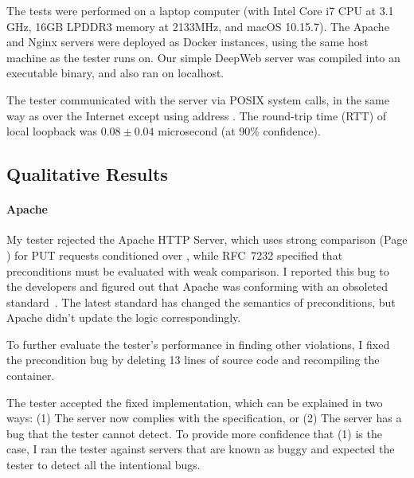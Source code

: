 The tests were performed on a laptop computer (with Intel Core i7 CPU at 3.1
GHz, 16GB LPDDR3 memory at 2133MHz, and macOS 10.15.7).  The Apache and Nginx
servers were deployed as Docker instances, using the same host machine as the
tester runs on.  Our simple DeepWeb server was compiled into an executable
binary, and also ran on localhost.

The tester communicated with the server via POSIX system calls, in the same way
as over the Internet except using address .  The round-trip
time (RTT) of local loopback was $0.08\pm0.04$ microsecond (at 90\% confidence).

\subsection{Qualitative Results}
\label{sec:http-qual}
\paragraph{Apache}
My tester rejected the Apache HTTP Server, which uses strong comparison
(Page \pageref{foot:etag}) for PUT requests conditioned
over , while RFC~7232 specified that
 preconditions must be evaluated with weak comparison.  I
reported this bug to the developers and figured out that Apache was conforming
with an obsoleted \http standard~\cite{rfc2616}.  The latest standard has
changed the semantics of  preconditions, but Apache
didn't update the logic correspondingly.

To further evaluate the tester's performance in finding other violations, I
fixed the precondition bug by deleting 13 lines of source code and recompiling
the container.

The tester accepted the fixed implementation, which can be explained in two
ways: (1) The server now complies with the specification, or (2) The server has
a bug that the tester cannot detect.  To provide more confidence that (1) is the
case, I ran the tester against servers that are known as buggy and expected the
tester to detect all the intentional bugs.

